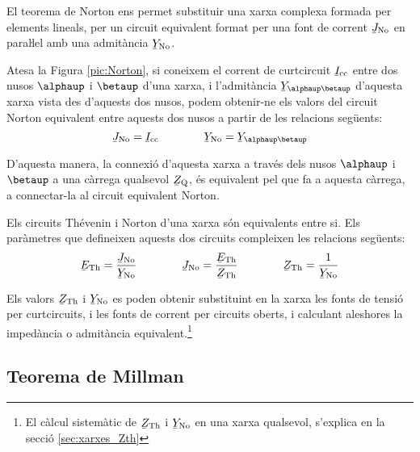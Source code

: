 El teorema de Norton ens permet substituir
una xarxa complexa formada per elements lineals, per un circuit
equivalent format per una font de corrent $\cmplx{J}\ped{No}$ en
paraŀlel amb una admitància $\cmplx{Y}\ped{No}$.

Atesa la Figura \vref{pic:Norton}, si coneixem el corrent de
curtcircuit $\cmplx{I}\ped{cc}$ entre dos nusos $\alphaup$ i $\betaup$
d'una xarxa, i l'admitància $\cmplx{Y}_{\alphaup\betaup}$ d'aquesta
xarxa vista des d'aquests dos nusos, podem obtenir-ne els valors del
circuit Norton equivalent entre aquests dos nusos a partir de les
relacions següents:
\begin{equation}
   \cmplx{J}\ped{No} = \cmplx{I}\ped{cc} \qquad\qquad \cmplx{Y}\ped{No} = \cmplx{Y}_{\alphaup\betaup}
\end{equation}

D'aquesta manera, la connexió d'aquesta xarxa a través dels nusos
$\alphaup$ i $\betaup$ a una càrrega qualsevol $\cmplx{Z}\ped{Q}$, és
equivalent pel que fa a aquesta càrrega, a connectar-la al circuit
equivalent Norton.
\begin{center}
    
    \label{pic:Norton}
\end{center}

Els circuits Thévenin i Norton d'una xarxa són equivalents entre si.
Els paràmetres que defineixen aquests dos circuits compleixen les relacions
següents:
\begin{equation}\label{eq:Thevenin-Norton}
   \cmplx{E}\ped{Th} = \frac{\cmplx{J}\ped{No}}{\cmplx{Y}\ped{No}} \qquad\qquad
   \cmplx{J}\ped{No} = \frac{\cmplx{E}\ped{Th}}{\cmplx{Z}\ped{Th}} \qquad\qquad
    \cmplx{Z}\ped{Th} = \frac{1}{\cmplx{Y}\ped{No}}
\end{equation}

Els valors $\cmplx{Z}\ped{Th}$ i  $\cmplx{Y}\ped{No}$ es poden
obtenir substituint en la xarxa  les fonts de tensió  per curtcircuits, i les fonts de corrent per circuits oberts, i calculant
aleshores la impedància o admitància equivalent.\footnote{El càlcul sistemàtic de $\cmplx{Z}\ped{Th}$ i  $\cmplx{Y}\ped{No}$ en una xarxa qualsevol, s'explica en la secció \ref{sec:xarxes_Zth}}

\subsection{Teorema de Millman}\label{sec:millman}

